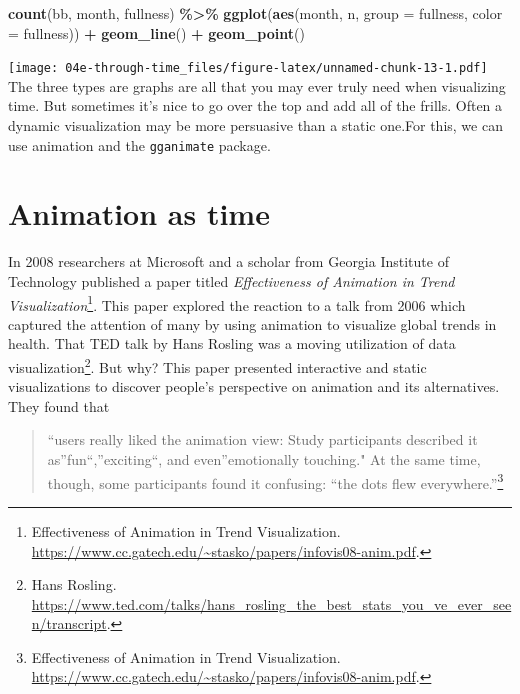 \documentclass[
]{book}
\newenvironment{Shaded}{\begin{snugshade}}{\end{snugshade}}
\newcommand{\DataTypeTok}[1]{\textcolor[rgb]{0.13,0.29,0.53}{#1}}
\newcommand{\KeywordTok}[1]{\textcolor[rgb]{0.13,0.29,0.53}{\textbf{#1}}}
\newcommand{\NormalTok}[1]{#1}
\newcommand{\OperatorTok}[1]{\textcolor[rgb]{0.81,0.36,0.00}{\textbf{#1}}}
\newcommand{\StringTok}[1]{\textcolor[rgb]{0.31,0.60,0.02}{#1}}
\begin{document}
\begin{Shaded}
\begin{Highlighting}[]
\KeywordTok{count}\NormalTok{(bb, month, fullness) }\OperatorTok{\%\textgreater{}\%}\StringTok{ }
\StringTok{  }\KeywordTok{ggplot}\NormalTok{(}\KeywordTok{aes}\NormalTok{(month, n, }\DataTypeTok{group =}\NormalTok{ fullness, }\DataTypeTok{color =}\NormalTok{ fullness)) }\OperatorTok{+}
\StringTok{  }\KeywordTok{geom\_line}\NormalTok{() }\OperatorTok{+}\StringTok{ }
\StringTok{  }\KeywordTok{geom\_point}\NormalTok{()}
\end{Highlighting}
\end{Shaded}

\texttt{[image: 04e-through-time\_files/figure-latex/unnamed-chunk-13-1.pdf]}
The three types are graphs are all that you may ever truly need when visualizing time. But sometimes it's nice to go over the top and add all of the frills. Often a dynamic visualization may be more persuasive than a static one.For this, we can use animation and the \texttt{gganimate} package.

\hypertarget{animation-as-time}{%
\section{Animation as time}\label{animation-as-time}}

In 2008 researchers at Microsoft and a scholar from Georgia Institute of Technology published a paper titled \emph{Effectiveness of Animation in Trend Visualization}\footnote{Effectiveness of Animation in Trend Visualization. \url{https://www.cc.gatech.edu/~stasko/papers/infovis08-anim.pdf}.}. This paper explored the reaction to a talk from 2006 which captured the attention of many by using animation to visualize global trends in health. That TED talk by Hans Rosling was a moving utilization of data visualization\footnote{Hans Rosling. \url{https://www.ted.com/talks/hans_rosling_the_best_stats_you_ve_ever_seen/transcript}.}. But why? This paper presented interactive and static visualizations to discover people's perspective on animation and its alternatives. They found that

\begin{quote}
``users really liked the animation view: Study participants described it as''fun``,''exciting``, and even''emotionally touching." At the same time, though, some participants found it confusing: ``the dots flew everywhere.''\footnote{Effectiveness of Animation in Trend Visualization. \url{https://www.cc.gatech.edu/~stasko/papers/infovis08-anim.pdf}.}
\end{quote}
\end{document}
